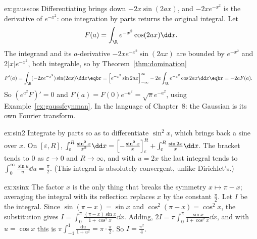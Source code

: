 \begin{solution}{ex:gausscos}
\idea Differentiating brings down $-2x\sin(2ax)$, and $-2xe^{-x^2}$ is the derivative of $e^{-x^2}$: one integration by parts returns
the original integral.
\writeup Let
\[
F(a)=\int_{\R}e^{-x^2}\cos(2ax)\dd x.
\]
The integrand and its $a$-derivative $-2xe^{-x^2}\sin(2ax)$ are bounded by $e^{-x^2}$
and $2|x|e^{-x^2}$, both integrable, so by Theorem~\ref{thm:domination}
\[
\begin{aligned}F'(a)&=\int_{\R}(-2xe^{-x^2})\sin(2ax)\dd x\eqbr=\Bigl[e^{-x^2}\sin2ax\Bigr]_{-\infty}^\infty-2a\int_{\R}e^{-x^2}\cos2ax\dd x\eqbr=-2aF(a).\end{aligned}
\]
So $(e^{a^2}F)'=0$ and $F(a)=F(0)e^{-a^2}=\sqrt\pi e^{-a^2}$, using Example~\ref{ex:gaussfeynman}. In the language of Chapter~8: the
Gaussian is its own Fourier transform.
\end{solution}

\begin{solution}{ex:sin2}
\idea Integrate by parts so as to differentiate $\sin^2x$, which brings back a sine over $x$.
\writeup On $[\varepsilon,R]$, $\int_\varepsilon^R\frac{\sin^2x}{x^2}\dd x=\Bigl[-\frac{\sin^2x}x\Bigr]_\varepsilon^R+\int_\varepsilon^R\frac{\sin2x}x\dd x$. The bracket tends to
$0$ as $\varepsilon\to0$ and $R\to\infty$, and with $u=2x$ the last integral tends to $\int_0^\infty\frac{\sin u}u\dd u=\frac\pi2$. (This integral is
absolutely convergent, unlike Dirichlet's.)
\end{solution}

\begin{solution}{ex:xsinx}
\idea The factor $x$ is the only thing that breaks the symmetry $x\mapsto\pi-x$; averaging the integral with its reflection
replaces $x$ by the constant $\frac\pi2$.
\writeup Let $I$ be the integral. Since $\sin(\pi-x)=\sin x$ and $\cos^2(\pi-x)=\cos^2x$, the substitution gives
$I=\int_0^\pi\frac{(\pi-x)\sin x}{1+\cos^2x}\dd x$. Adding, $2I=\pi\int_0^\pi\frac{\sin x}{1+\cos^2x}\dd x$, and with $u=\cos x$ this is
$\pi\int_{-1}^1\frac{\mathrm du}{1+u^2}=\pi\cdot\frac\pi2$. So $I=\frac{\pi^2}4$.
\end{solution}

